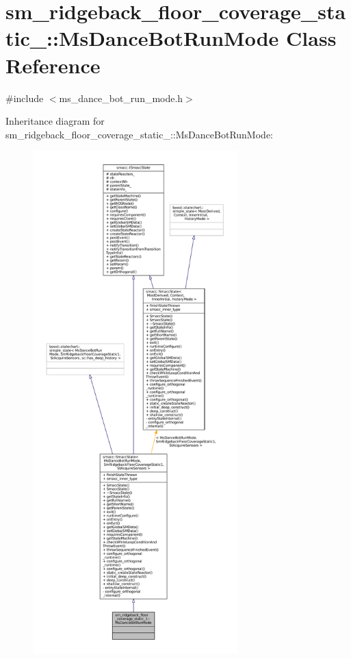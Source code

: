 \hypertarget{classsm__ridgeback__floor__coverage__static__1_1_1MsDanceBotRunMode}{}\section{sm\+\_\+ridgeback\+\_\+floor\+\_\+coverage\+\_\+static\+\_\+:\+:Ms\+Dance\+Bot\+Run\+Mode Class Reference}
\label{classsm__ridgeback__floor__coverage__static__1_1_1MsDanceBotRunMode}


{\ttfamily \#include $<$ms\+\_\+dance\+\_\+bot\+\_\+run\+\_\+mode.\+h$>$}



Inheritance diagram for sm\+\_\+ridgeback\+\_\+floor\+\_\+coverage\+\_\+static\+\_\+:\+:Ms\+Dance\+Bot\+Run\+Mode\+:
\nopagebreak
\begin{figure}[H]
\begin{center}
\leavevmode
\includegraphics[height=550pt]{classsm__ridgeback__floor__coverage__static__1_1_1MsDanceBotRunMode__inherit__graph}
\end{center}
\end{figure}



